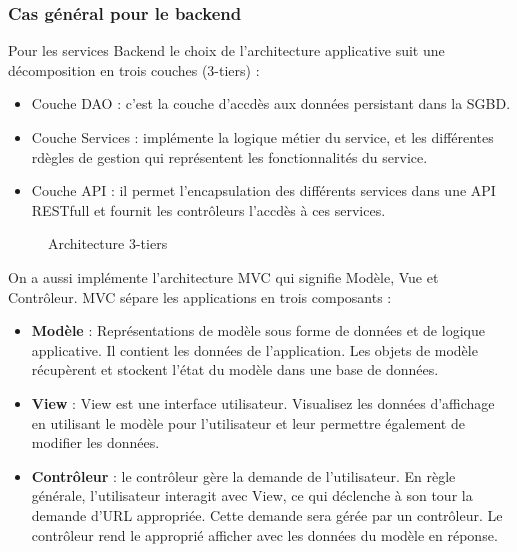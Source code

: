 \subsubsection{Cas g\'en\'eral pour le backend}
Pour les services Backend le choix de l'architecture applicative suit une d\'ecomposition en trois couches (3-tiers) :
\begin{itemize}
\item Couche DAO : c'est la couche d'accd\`es aux donn\'ees persistant dans la SGBD.
\item Couche Services : impl\'emente la logique m\'etier du service, et les diff\'erentes rd\`egles de gestion qui repr\'esentent les fonctionnalit\'es du service.
\item Couche API : il permet l'encapsulation des diff\'erents services dans une API RESTfull et fournit les contr\^oleurs l'accd\`es \`a ces services.
\end{itemize}

\begin{figure}[H]
	\caption{\label{fig:my-label} Architecture 3-tiers}
\end{figure}

On a aussi impl\'emente l'architecture \gls{MVC} qui signifie  Mod\`ele, Vue et Contr\^oleur. MVC s\'epare les applications en trois composants : 

\begin{itemize}
\item \textbf{Mod\`ele} : Repr\'esentations de mod\`ele sous forme de donn\'ees et de logique applicative. Il contient les donn\'ees de l'application. Les objets de mod\`ele r\'ecup\`erent et stockent l'\'etat du mod\`ele dans une base de donn\'ees.

\item \textbf{View} : View est une interface utilisateur. Visualisez les donn\'ees d'affichage en utilisant le mod\`ele pour l'utilisateur et leur permettre \'egalement de modifier les donn\'ees.

\item \textbf{Contr\^oleur} : le contr\^oleur g\`ere la demande de l'utilisateur. En r\`egle g\'en\'erale, l'utilisateur interagit avec View, ce qui d\'eclenche \`a son tour la demande d'URL appropri\'ee. Cette demande sera g\'er\'ee par un contr\^oleur. Le contr\^oleur rend le appropri\'e
afficher avec les donn\'ees du mod\`ele en r\'eponse.
\end{itemize}

